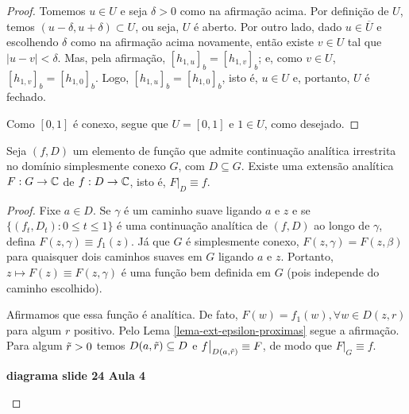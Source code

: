 \begin{proof}
        Tomemos $u\in U$ e seja $\delta > 0$ como na afirmação acima. Por definição de $U$,
        temos $(u-\delta, u+\delta) \subset U$, ou seja, $U$ é aberto. Por outro lado, dado
        $u\in\overline{U}$ e escolhendo $\delta$ como na afirmação acima novamente, então 
        existe $v\in U$ tal que $|u-v| < \delta$. Mas, pela afirmação, 
        $[h_{1,u}]_b = [h_{1,v}]_b$; e, como $v\in U$, $[h_{1,v}]_b = [h_{1,0}]_b$.
        Logo, $[h_{1,u}]_b = [h_{1,0}]_b$, isto é, $u\in U$ e, portanto, $U$ é fechado.
        
        Como $[0,1]$ é conexo, segue que $U = [0,1]$ e $1\in U$, como desejado.
    \end{proof}

    \begin{corolario}
        Seja $(f,D)$ um elemento de função que admite continuação analítica irrestrita no
        domínio simplesmente conexo $G$, com $D\subseteq G$. Existe uma extensão analítica
        $F:G\to\mathbb{C}$ de $f:D\to\mathbb{C}$, isto é, $F\big|_D \equiv f$.
    \end{corolario}

    \begin{proof}
        Fixe $a\in D$. Se $\gamma$ é um caminho suave ligando $a$ e $z$ e se 
        $\{ (f_t, D_t) : 0\leq t\leq 1 \}$ é uma continuação analítica de $(f,D)$ ao longo de
        $\gamma$, defina $F(z, \gamma) \equiv f_1(z)$. Já que $G$ é simplesmente conexo,
        $F(z, \gamma) = F(z,\beta)$ para quaisquer dois caminhos suaves em $G$ ligando $a$ e $z$.
        Portanto, $z\mapsto F(z)\equiv F(z, \gamma)$ é uma função bem definida em $G$ 
        (pois independe do caminho escolhido).
        
        Afirmamos que essa função é analítica. De fato, $F(w) = f_1(w), \forall w\in D(z,r)$
        para algum $r$ positivo. Pelo Lema \ref{lema-ext-epsilon-proximas} segue a afirmação.
        Para algum $\Tilde{r}>0$ temos $D(a, \Tilde{r}) \subseteq D$ e 
        $f\big|_{D(a, \Tilde{r})} \equiv F$, de modo que $F\big|_G \equiv f$.
        \begin{center}
            \textbf{diagrama slide 24 Aula 4}
        \end{center}
    \end{proof}